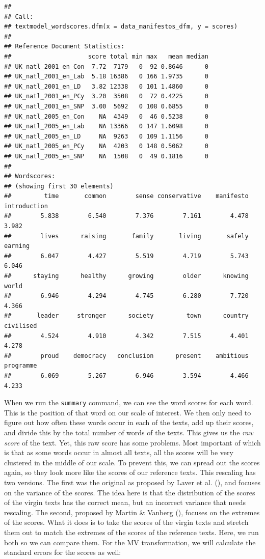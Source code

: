 \documentclass[
]{book}
\begin{document}
\begin{verbatim}
## 
## Call:
## textmodel_wordscores.dfm(x = data_manifestos_dfm, y = scores)
## 
## Reference Document Statistics:
##                     score total min max   mean median
## UK_natl_2001_en_Con  7.72  7179   0  92 0.8646      0
## UK_natl_2001_en_Lab  5.18 16386   0 166 1.9735      0
## UK_natl_2001_en_LD   3.82 12338   0 101 1.4860      0
## UK_natl_2001_en_PCy  3.20  3508   0  72 0.4225      0
## UK_natl_2001_en_SNP  3.00  5692   0 108 0.6855      0
## UK_natl_2005_en_Con    NA  4349   0  46 0.5238      0
## UK_natl_2005_en_Lab    NA 13366   0 147 1.6098      0
## UK_natl_2005_en_LD     NA  9263   0 109 1.1156      0
## UK_natl_2005_en_PCy    NA  4203   0 148 0.5062      0
## UK_natl_2005_en_SNP    NA  1508   0  49 0.1816      0
## 
## Wordscores:
## (showing first 30 elements)
##         time       common        sense conservative    manifesto introduction 
##        5.838        6.540        7.376        7.161        4.478        3.982 
##        lives      raising       family       living       safely      earning 
##        6.047        4.427        5.519        4.719        5.743        6.046 
##      staying      healthy      growing        older      knowing        world 
##        6.946        4.294        4.745        6.280        7.720        4.366 
##       leader     stronger      society         town      country    civilised 
##        4.524        4.910        4.342        7.515        4.401        4.278 
##        proud    democracy   conclusion      present    ambitious    programme 
##        6.069        5.267        6.946        3.594        4.466        4.233
\end{verbatim}

When we run the \texttt{summary} command, we can see the word scores for each word. This is the position of that word on our scale of interest. We then only need to figure out how often these words occur in each of the texts, add up their scores, and divide this by the total number of words of the texts. This gives us the \emph{raw score} of the text. Yet, this raw score has some problems. Most important of which is that as some words occur in almost all texts, all the scores will be very clustered in the middle of our scale. To prevent this, we can spread out the scores again, so they look more like the scores of our reference texts. This rescaling has two versions. The first was the original as proposed by Laver et al. (), and focuses on the variance of the scores. The idea here is that the distribution of the scores of the virgin texts has the correct mean, but an incorrect variance that needs rescaling. The second, proposed by Martin \& Vanberg (), focuses on the extremes of the scores. What it does is to take the scores of the virgin texts and stretch them out to match the extremes of the scores of the reference texts. Here, we run both so we can compare them. For the MV transformation, we will calculate the standard errors for the scores as well:
\end{document}
